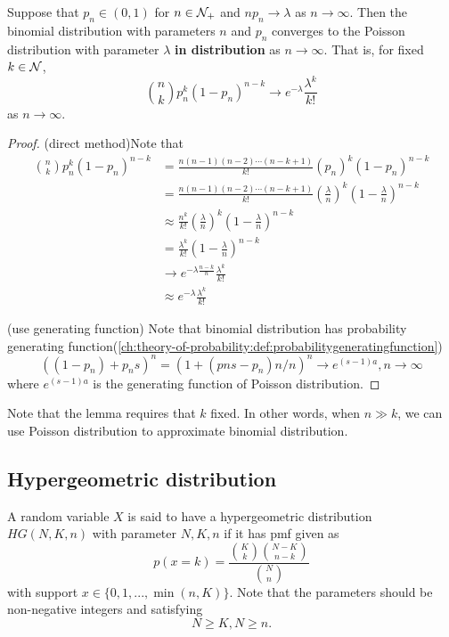 \begin{refsection}
\begin{lemma}
Suppose that $p_n\in (0,1)$ for $n\in \mathcal{N}_+$ and $np_n\to \lambda$ as $n\to \infty$. Then the binomial distribution with parameters $n$ and $p_n$ converges to the Poisson distribution with parameter $\lambda$ \textbf{in distribution}  as $n\to \infty$. That is, for fixed $k\in \mathcal{N}$, 
$$\binom{n}{k}p_n^k(1-p_n)^{n-k} \to e^{-\lambda}\frac{\lambda^k}{k!}$$
as $n\to \infty$.
\end{lemma}
\begin{proof}
(direct method)Note that
\begin{align*}
\binom{n}{k}p_n^k(1-p_n)^{n-k} &=\frac{n(n-1)(n-2)\cdots(n-k+1)}{k!}(p_n)^k(1-p_n)^{n-k} \\
&=\frac{n(n-1)(n-2)\cdots(n-k+1)}{k!}(\frac{\lambda}{n})^k(1-\frac{\lambda}{n})^{n-k} \\
&\approx\frac{n^k}{k!}(\frac{\lambda}{n})^k(1-\frac{\lambda}{n})^{n-k} \\
&=\frac{\lambda^k}{k!}(1-\frac{\lambda}{n})^{n-k}\\
&\to e^{-\lambda \frac{n-k}{n}} \frac{\lambda^k}{k!}\\
&\approx e^{-\lambda} \frac{\lambda^k}{k!}
\end{align*}

(use generating function)
Note that binomial distribution has probability generating function(\autoref{ch:theory-of-probability:def:probabilitygeneratingfunction})
$$((1-p_n)+p_ns)^n = (1 + (pns-p_n)n/n)^n \to e^{(s-1)a},n\to\infty$$
where $e^{(s-1)a}$ is the generating function of Poisson distribution.
\end{proof}

\begin{remark}
Note that the lemma requires that $k$ fixed. In other words, when $n\gg k$, we can use Poisson distribution to approximate binomial distribution.
\end{remark}

\subsection{Hypergeometric distribution}
\begin{definition}\cite[148]{hoggintroduction}
	A random variable $X$ is said to have a hypergeometric distribution $HG(N,K,n)$ with parameter $N,K,n$ if it has pmf given as
	$$p(x = k) = \frac{\binom{K}{k}\binom{N-K}{n-k}}{\binom{N}{n}} $$
	with support $x\in \{0,1,...,\min(n,K)\}$. Note that the parameters should be non-negative integers and satisfying $$N\geq K, N\geq n.$$


\end{definition}
\end{refsection}
